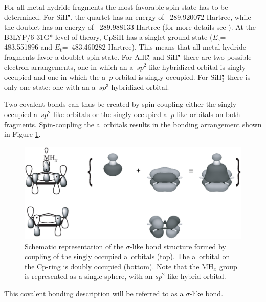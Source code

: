 For all metal hydride fragments the most favorable spin state has to be determined. For SiH$^\bullet$, the quartet has an energy of \mbox{--289.920072} Hartree, while the doublet has an energy of \mbox{--289.988133} Hartree (for more details see \cite{kalemos}). At the B3LYP/6-31G* level of theory, CpSiH has a singlet ground state ($E_\mathrm{s}$=\mbox{--483.551896} and $E_\mathrm{t}$=\mbox{--483.460282} Hartree). This means that all metal hydride fragments favor a doublet spin state. For AlH$_2^\bullet$ and SiH$^\bullet$ there are two possible electron arrangements, one in which an a\textquotesingle\ $sp^2$-like hybridized orbital is singly occupied and one in which the a\textquotesingle\textquotesingle\ $p$ orbital is singly occupied. For SiH$_3^\bullet$ there is only one state: one with an a\textquotesingle\ $sp^3$ hybridized orbital. 

Two covalent bonds can thus be created by spin-coupling either the singly occupied a\textquotesingle\ $sp^2$-like orbitals or the singly occupied a\textquotesingle\textquotesingle\ $p$-like orbitals on both fragments. Spin-coupling the a\textquotesingle\ orbitals results in the bonding arrangement shown in Figure \ref{ch4.fig.sigma}.
\begin{figure}[htbp]
\center
\includegraphics[scale=0.45]{cyclopentadienyl/figures/sigma.eps}
\caption{Schematic representation of the $\sigma$-like bond structure formed by coupling of the singly occupied a\textquotesingle\ orbitals (top). The a\textquotesingle\textquotesingle\ orbital on the Cp-ring is doubly occupied (bottom). Note that the MH$_x$ group is represented as a single sphere, with an $sp^2$-like hybrid orbital.}
\label{ch4.fig.sigma}
\end{figure}
This covalent bonding description will be referred to as a $\sigma$-like bond.

